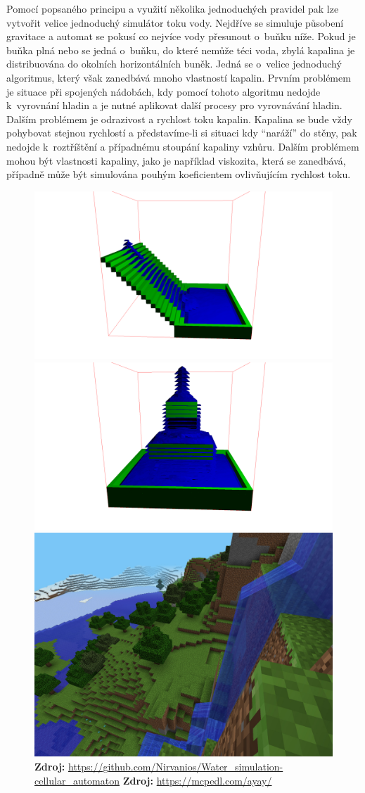 Pomocí popsaného principu a využití několika jednoduchých pravidel pak lze vytvořit velice jednoduchý simulátor toku vody. Nejdříve se simuluje působení gravitace a automat se pokusí co nejvíce vody přesunout o~buňku níže. Pokud je buňka plná nebo se jedná o~buňku, do které nemůže téci voda, zbylá kapalina je distribuována do okolních horizontálních buněk. Jedná se o~velice jednoduchý algoritmus, který však zanedbává mnoho vlastností kapalin. Prvním problémem je situace při spojených nádobách, kdy pomocí tohoto algoritmu nedojde k~vyrovnání hladin a je nutné aplikovat další procesy pro vyrovnávání hladin. Dalším problémem je odrazivost a rychlost toku kapalin. Kapalina se bude vždy pohybovat stejnou rychlostí a představíme-li si situaci kdy \enquote{naráží} do stěny, pak nedojde k~roztříštění a případnému stoupání kapaliny vzhůru. Dalším problémem mohou být vlastnosti kapaliny, jako je například viskozita, která se zanedbává, případně může být simulována pouhým koeficientem ovlivňujícím rychlost toku. \cite{Medvecky-Heretik2018thesis}

\begin{figure}[h!]\centering
	\centering
	\captionsetup{justification=centering}
	\includegraphics[width=0.5\linewidth]{obrazky-figures/cellular1.png}\hfill
	\includegraphics[width=0.5\linewidth]{obrazky-figures/cellular2.png}\hfill
	\includegraphics[width=0.5\linewidth]{obrazky-figures/miecraft.jpg}\hfill
	\textbf{Zdroj: } \url{https://github.com/Nirvanios/Water_simulation-cellular_automaton} 
	\textbf{Zdroj: } \url{https://mcpedl.com/ayay/}
	\label{fig:SWE}
\end{figure}

